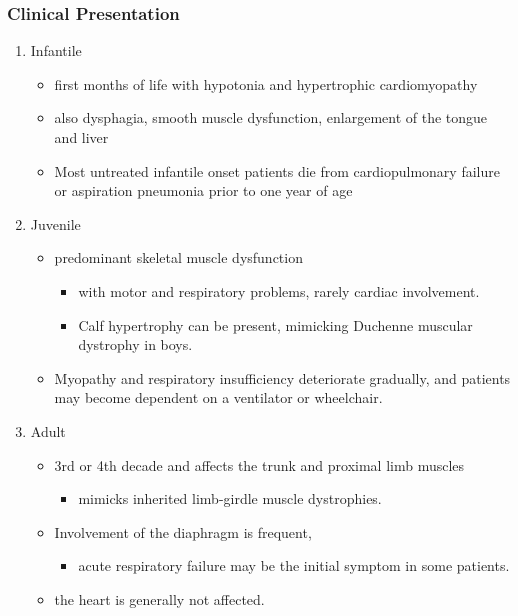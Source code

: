 \documentclass{scrartcl}
\begin{document}
\subsubsection{Clinical Presentation}
\label{sec:org34622cb}
\begin{enumerate}
\item Infantile
\label{sec:org910a128}
\begin{itemize}
\item first months of life with hypotonia and hypertrophic cardiomyopathy
\item also dysphagia, smooth muscle dysfunction, enlargement of the tongue
and liver
\item Most untreated infantile onset patients die from cardiopulmonary
failure or aspiration pneumonia prior to one year of age
\end{itemize}
\item Juvenile
\label{sec:org96c0cf2}
\begin{itemize}
\item predominant skeletal muscle dysfunction
\begin{itemize}
\item with motor and respiratory problems, rarely cardiac involvement.
\item Calf hypertrophy can be present, mimicking Duchenne muscular dystrophy in boys.
\end{itemize}
\item Myopathy and respiratory insufficiency deteriorate gradually, and patients may become dependent on a ventilator or wheelchair.
\end{itemize}
\item Adult
\label{sec:orgd2836c1}
\begin{itemize}
\item 3rd or 4th decade and affects the trunk and proximal limb muscles
\begin{itemize}
\item mimicks inherited limb-girdle muscle dystrophies.
\end{itemize}
\item Involvement of the diaphragm is frequent,
\begin{itemize}
\item acute respiratory failure may be the initial symptom in some patients.
\end{itemize}
\item the heart is generally not affected.
\end{itemize}
\end{enumerate}
\end{document}
